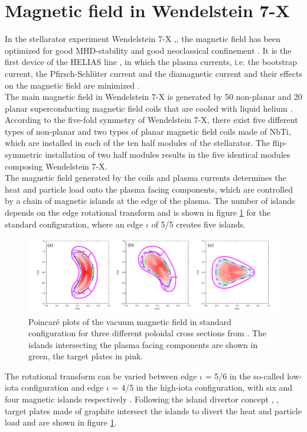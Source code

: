 \section{Magnetic field in Wendelstein 7-X}
In the stellarator experiment Wendelstein 7-X \cite{Beidler1990},\cite{Klinger2013}, the magnetic field has been optimized for good MHD-stability and good neoclassical confinement \cite{Grieger1992}. It is the first device of the HELIAS line \cite{Nuhrenberg1986}, in which the plasma currents, i.e. the bootstrap current, the Pfirsch-Schlüter current and the diamagnetic current and their effects on the magnetic field are minimized \cite{Dinklage2018}.\\
The main magnetic field in Wendelstein 7-X is generated by 50 non-planar and 20 planar superconducting magnetic field coils that are cooled with liquid helium \cite{Rummel2012}. According to the five-fold symmetry of Wendelstein 7-X, there exist five different types of non-planar and two types of planar magnetic field coils made of NbTi, which are installed in each of the ten half modules of the stellarator. The flip-symmetric installation of two half modules results in the five identical modules composing Wendelstein 7-X. \\
The magnetic field generated by the coils and plasma currents determines the heat and particle load onto the plasma facing components, which are controlled by a chain of magnetic islands at the edge of the plasma. The number of islands depends on the edge rotational transform and is shown in figure \ref{fig:1} for the standard configuration, where an edge $\iota$ of 5/5 creates five islands.
\begin{figure}[!htb]
    \centering
    \includegraphics[width=\textwidth]{images/islands.png}
    \caption{Poincaré plots of the vacuum magnetic field in standard configuration for three different poloidal cross sections from \cite{Suzuki2016}. The islands intersecting the plasma facing components are shown in green, the target plates in pink.} \label{fig:1}
\end{figure}

The rotational transform can be varied between edge $\iota$ = 5/6 in the so-called low-iota configuration and edge $\iota$ = 4/5 in the high-iota configuration, with six and four magnetic islands respectively \cite{Knieps2021}. Following the island divertor concept \cite{Konig2002}, \cite{Renner2002}, target plates made of graphite intersect the islands to divert the heat and particle load and are shown in figure \ref{fig:1}.

